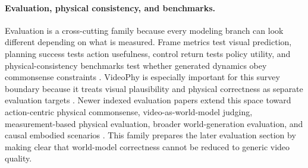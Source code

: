 \paragraph{Evaluation, physical consistency, and benchmarks.}
Evaluation is a cross-cutting family because every modeling branch can look different depending on what is measured. Frame metrics test visual prediction, planning success tests action usefulness, control return tests policy utility, and physical-consistency benchmarks test whether generated dynamics obey commonsense constraints \cite{oh2015_action_conditional_video_prediction_prov,janner2019_o2p2_prov,alonso2024_diamond_prov,bansal2025_videophy_prov}. VideoPhy is especially important for this survey boundary because it treats visual plausibility and physical correctness as separate evaluation targets \cite{bansal2025_videophy_prov}. Newer indexed evaluation papers extend this space toward action-centric physical commonsense, video-as-world-model judging, measurement-based physical evaluation, broader world-generation evaluation, and causal embodied scenarios \cite{bansal2025videophy2_prov,li2025worldmodelbench_prov,zhang2025morpheus_prov,duan2025worldscore,cai2026whatifworld_prov}. This family prepares the later evaluation section by making clear that world-model correctness cannot be reduced to generic video quality.


